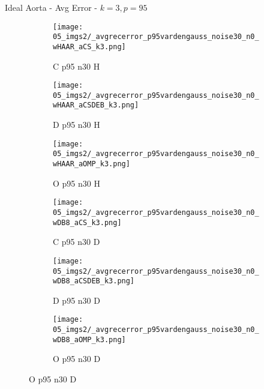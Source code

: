\begin{frame}{Ideal Aorta - Avg Error - $k=3,p=95$}{}
\begin{figure}
\begin{subfigure}{0.13\textwidth}
\texttt{[image: 05\_imgs2/\_avgrecerror\_p95vardengauss\_noise30\_n0\_wHAAR\_aCS\_k3.png]}
\caption*{\tiny C p95 n30 H}
\end{subfigure}
\begin{subfigure}{0.13\textwidth}
\texttt{[image: 05\_imgs2/\_avgrecerror\_p95vardengauss\_noise30\_n0\_wHAAR\_aCSDEB\_k3.png]}
\caption*{\tiny D p95 n30 H}
\end{subfigure}
\begin{subfigure}{0.13\textwidth}
\texttt{[image: 05\_imgs2/\_avgrecerror\_p95vardengauss\_noise30\_n0\_wHAAR\_aOMP\_k3.png]}
\caption*{\tiny O p95 n30 H}
\end{subfigure}
\begin{subfigure}{0.13\textwidth}
\texttt{[image: 05\_imgs2/\_avgrecerror\_p95vardengauss\_noise30\_n0\_wDB8\_aCS\_k3.png]}
\caption*{\tiny C p95 n30 D}
\end{subfigure}
\begin{subfigure}{0.13\textwidth}
\texttt{[image: 05\_imgs2/\_avgrecerror\_p95vardengauss\_noise30\_n0\_wDB8\_aCSDEB\_k3.png]}
\caption*{\tiny D p95 n30 D}
\end{subfigure}
\begin{subfigure}{0.13\textwidth}
\texttt{[image: 05\_imgs2/\_avgrecerror\_p95vardengauss\_noise30\_n0\_wDB8\_aOMP\_k3.png]}
\caption*{\tiny O p95 n30 D}
\end{subfigure}
\end{figure}
\end{frame}


